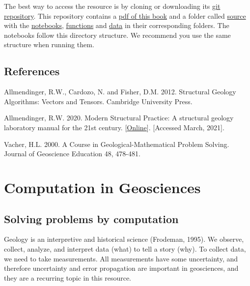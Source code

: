 \documentclass[a4paper , 12pt]{book}
\begin{document}
The best way to access the resource is by cloning or downloading its \href{https://github.com/nfcd/compGeo}{git repository}. This repository contains a \href{https://github.com/nfcd/compGeo/blob/master/compGeo.pdf}{pdf of this book} and a folder called \href{https://github.com/nfcd/compGeo/blob/master/source}{source} with the \href{https://github.com/nfcd/compGeo/blob/master/source/notebooks}{notebooks}, \href{https://github.com/nfcd/compGeo/blob/master/source/functions}{functions} and \href{https://github.com/nfcd/compGeo/blob/master/source/data}{data} in their corresponding folders. The notebooks follow this directory structure. We recommend you use the same structure when running them.

\section*{References}

Allmendinger, R.W., Cardozo, N. and Fisher, D.M. 2012. Structural Geology Algorithms: Vectors and Tensors. Cambridge University Press.

Allmendinger, R.W. 2020. Modern Structural Practice: A structural geology laboratory manual for the 21st century. [\href{https://www.rickallmendinger.net/download}{Online}]. [Accessed March, 2021].

Vacher, H.L. 2000. A Course in Geological-Mathematical Problem Solving. Journal of Geoscience Education 48, 478-481.

\tableofcontents

\chapter{Computation in Geosciences}

\section{Solving problems by computation}

Geology is an interpretive and historical science (Frodeman, 1995). We observe, collect, analyze, and interpret data (what) to tell a story (why). To collect data, we need to take measurements. All measurements have some uncertainty, and therefore uncertainty and error propagation are important in geosciences, and they are a recurring topic in this resource.
\end{document}
